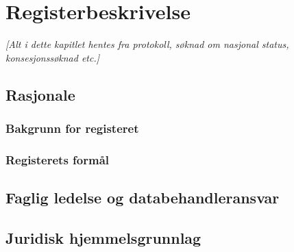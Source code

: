 \documentclass[norsk, a4paper, twocolumn]{report}
\newcommand{\guide}[1] {
	\textit{[\textcolor{guidegray}{#1}]}
	}
\begin{document}
\twocolumn




\chapter{Registerbeskrivelse}\label{cha:reg}
\guide{Alt i dette kapitlet hentes fra protokoll, søknad om nasjonal status,
konsesjonssøknad etc.}


\section{Rasjonale}\label{cha:ras}
\subsection{Bakgrunn for registeret}\label{sec:bak}
\subsection{Registerets formål}\label{sec:for}

\section{Faglig ledelse og databehandleransvar}\label{cha:led}
\section{Juridisk hjemmelsgrunnlag}\label{cha:jur}



\end{document}
